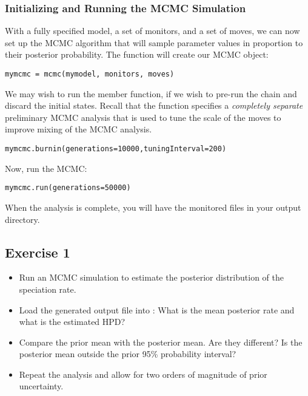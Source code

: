 \subsubsection{Initializing and Running the MCMC Simulation}

With a fully specified model, a set of monitors, and a set of moves, we can now set up the MCMC algorithm that will sample parameter values in proportion to their posterior probability. The  function will create our MCMC object:
{\tt \begin{snugshade*}
\begin{lstlisting}
mymcmc = mcmc(mymodel, monitors, moves)
\end{lstlisting}
\end{snugshade*}}


We may wish to run the  member function, \IE if we wish to pre-run the chain and discard the initial states. 
Recall that the  function specifies a \textit{completely separate} preliminary MCMC analysis that is used to tune the scale of the moves to improve mixing of the MCMC analysis.
{\tt \begin{snugshade*}
\begin{lstlisting}
mymcmc.burnin(generations=10000,tuningInterval=200)
\end{lstlisting}
\end{snugshade*}}


Now, run the MCMC:
{\tt \begin{snugshade*}
\begin{lstlisting}
mymcmc.run(generations=50000)
\end{lstlisting}
\end{snugshade*}}

When the analysis is complete, you will have the monitored files in your output directory.



\subsection{Exercise 1}

\begin{itemize}
\item Run an MCMC simulation to estimate the posterior distribution of the speciation rate.
\item Load the generated output file into \Tracer: What is the mean posterior rate and what is the estimated HPD?
\item Compare the prior mean with the posterior mean. Are they different? Is the posterior mean outside the prior 95\% probability interval?
\item Repeat the analysis and allow for two orders of magnitude of prior uncertainty.
\end{itemize}




